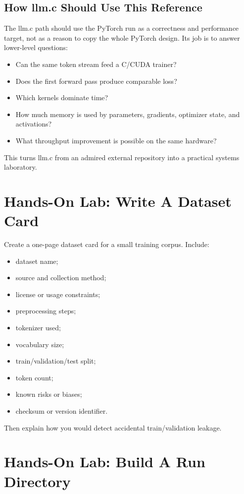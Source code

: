 \subsection{How llm.c Should Use This Reference}

The llm.c path should use the PyTorch run as a correctness and performance target, not as
a reason to copy the whole PyTorch design. Its job is to answer lower-level questions:

\begin{itemize}
  \item Can the same token stream feed a C/CUDA trainer?
  \item Does the first forward pass produce comparable loss?
  \item Which kernels dominate time?
  \item How much memory is used by parameters, gradients, optimizer state, and activations?
  \item What throughput improvement is possible on the same hardware?
\end{itemize}

This turns llm.c from an admired external repository into a practical systems laboratory.

\section{Hands-On Lab: Write A Dataset Card}

Create a one-page dataset card for a small training corpus. Include:

\begin{itemize}
  \item dataset name;
  \item source and collection method;
  \item license or usage constraints;
  \item preprocessing steps;
  \item tokenizer used;
  \item vocabulary size;
  \item train/validation/test split;
  \item token count;
  \item known risks or biases;
  \item checksum or version identifier.
\end{itemize}

Then explain how you would detect accidental train/validation leakage.

\section{Hands-On Lab: Build A Run Directory}

